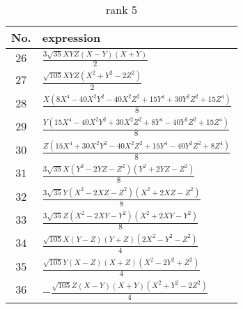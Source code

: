 \documentclass[fleqn,8pt,landscape]{jsarticle}
\begin{document}
\begin{table}[ht!]
\begin{center}
\caption{rank 5}
\renewcommand{\arraystretch}{1.3}
\begin{tabular}{cl} \hline \hline
No. & expression \\ \hline
$ 26 $ & $ \frac{3 \sqrt{35} X Y Z \left(X - Y\right) \left(X + Y\right)}{2} $ \\
$ 27 $ & $ \frac{\sqrt{105} X Y Z \left(X^{2} + Y^{2} - 2 Z^{2}\right)}{2} $ \\
$ 28 $ & $ \frac{X \left(8 X^{4} - 40 X^{2} Y^{2} - 40 X^{2} Z^{2} + 15 Y^{4} + 30 Y^{2} Z^{2} + 15 Z^{4}\right)}{8} $ \\
$ 29 $ & $ \frac{Y \left(15 X^{4} - 40 X^{2} Y^{2} + 30 X^{2} Z^{2} + 8 Y^{4} - 40 Y^{2} Z^{2} + 15 Z^{4}\right)}{8} $ \\
$ 30 $ & $ \frac{Z \left(15 X^{4} + 30 X^{2} Y^{2} - 40 X^{2} Z^{2} + 15 Y^{4} - 40 Y^{2} Z^{2} + 8 Z^{4}\right)}{8} $ \\
$ 31 $ & $ \frac{3 \sqrt{35} X \left(Y^{2} - 2 Y Z - Z^{2}\right) \left(Y^{2} + 2 Y Z - Z^{2}\right)}{8} $ \\
$ 32 $ & $ \frac{3 \sqrt{35} Y \left(X^{2} - 2 X Z - Z^{2}\right) \left(X^{2} + 2 X Z - Z^{2}\right)}{8} $ \\
$ 33 $ & $ \frac{3 \sqrt{35} Z \left(X^{2} - 2 X Y - Y^{2}\right) \left(X^{2} + 2 X Y - Y^{2}\right)}{8} $ \\
$ 34 $ & $ \frac{\sqrt{105} X \left(Y - Z\right) \left(Y + Z\right) \left(2 X^{2} - Y^{2} - Z^{2}\right)}{4} $ \\
$ 35 $ & $ \frac{\sqrt{105} Y \left(X - Z\right) \left(X + Z\right) \left(X^{2} - 2 Y^{2} + Z^{2}\right)}{4} $ \\
$ 36 $ & $ - \frac{\sqrt{105} Z \left(X - Y\right) \left(X + Y\right) \left(X^{2} + Y^{2} - 2 Z^{2}\right)}{4} $ \\
 \hline \hline
\end{tabular}
\end{center}
\end{table}
\end{document}

